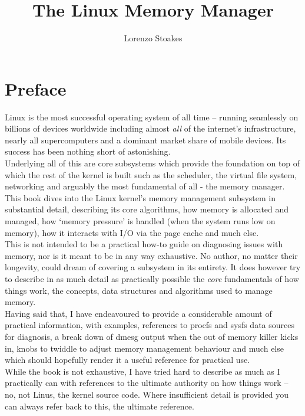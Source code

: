 \documentclass[a4paper,oneside]{scrbook}
\begin{document}
\title{The Linux Memory Manager}
\author{Lorenzo Stoakes}
\frontmatter
\date{} %
\maketitle
\tableofcontents
\chapter{Preface}
Linux is the most successful operating system of all time -- running seamlessly
on billions of devices worldwide including almost \emph{all} of the
internet's infrastructure, nearly all supercomputers and a dominant market share
of mobile devices. Its success has been nothing short of astonishing.\\

Underlying all of this are core subsystems which provide the foundation on top
of which the rest of the kernel is built such as the scheduler, the virtual file
system, networking and arguably the most fundamental of all - the memory
manager.\\

This book dives into the Linux kernel's memory management subsystem in
substantial detail, describing its core algorithms, how memory is allocated and
managed, how `memory pressure' is handled (when the system runs low on memory),
how it interacts with I/O via the page cache and much else.\\

This is not intended to be a practical how-to guide on diagnosing issues with
memory, nor is it meant to be in any way exhaustive. No author, no matter their
longevity, could dream of covering a subsystem in its entirety. It does however
try to describe in as much detail as practically possible the \emph{core}
fundamentals of how things work, the concepts, data structures and algorithms
used to manage memory.\\

Having said that, I have endeavoured to provide a considerable amount of
practical information, with examples, references to procfs and sysfs data
sources for diagnosis, a break down of dmesg output when the out of memory
killer kicks in, knobs to twiddle to adjust memory management behaviour and much
else which should hopefully render it a useful reference for practical use.\\

While the book is not exhaustive, I have tried hard to describe as much as I
practically can with references to the ultimate authority on how things work --
no, not Linus, the kernel source code. Where insufficient detail is provided you
can always refer back to this, the ultimate reference.\\
\end{document}

